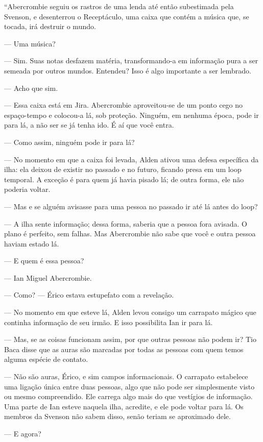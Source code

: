 “Abercrombie seguiu os rastros de uma lenda até então subestimada pela Svenson,
e desenterrou o Receptáculo, uma caixa que contém a música que, se tocada, irá
destruir o mundo.

--- Uma música?

--- Sim. Suas notas desfazem matéria, transformando-a em informação pura a ser
semeada por outros mundos. Entendeu? Isso é algo importante a ser lembrado.

--- Acho que sim.

--- Essa caixa está em Jira. Abercrombie aproveitou-se de um ponto cego no
es\-pa\-ço-tempo e colocou-a lá, sob proteção. Ninguém, em nenhuma época, pode ir
para lá, a não ser se já tenha ido. É aí que você entra.

--- Como assim, ninguém pode ir para lá?

--- No momento em que a caixa foi levada, Alden ativou uma defesa específica da
ilha: ela deixou de existir no passado e no futuro, ficando presa em um loop
temporal. A exceção é para quem já havia pisado lá; de outra forma, ele não
poderia voltar.

--- Mas e se alguém avisasse para uma pessoa no passado ir até lá antes do
loop?

--- A ilha sente informação; dessa forma, saberia que a pessoa fora avisada. O
plano é perfeito, sem falhas. Mas Abercrombie não sabe que você e outra pessoa
haviam estado lá.

--- E quem é essa pessoa?

--- Ian Miguel Abercrombie.

--- Como? --- Érico estava estupefato com a revelação.

--- No momento em que esteve lá, Alden levou consigo um carrapato mágico que
continha informação de seu irmão. E isso possibilita Ian ir para lá.

--- Mas, se as coisas funcionam assim, por que outras pessoas não podem ir? Tio
Baca disse que as auras são marcadas por todas as pessoas com quem temos alguma
espécie de contato.

--- Não são auras, Érico, e sim campos informacionais. O carrapato estabelece
uma ligação única entre duas pessoas, algo que não pode ser simplesmente visto
ou mesmo compreendido. Ele carrega algo mais do que vestígios de informação.
Uma parte de Ian esteve naquela ilha, acredite, e ele pode voltar para lá. Os
membros da Svenson não sabem disso, senão teriam se aproximado dele.

--- E agora?

